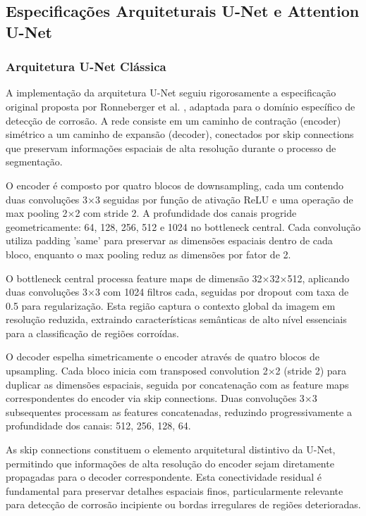 \documentclass[12pt,a4paper,twoside]{article}
\begin{document}
\subsection{Especificações Arquiteturais U-Net e Attention U-Net}
\label{subsec:arquiteturas}

\subsubsection{Arquitetura U-Net Clássica}
\label{subsubsec:unet_classica}

A implementação da arquitetura U-Net seguiu rigorosamente a especificação original proposta por Ronneberger et al. \cite{ronneberger2015u}, adaptada para o domínio específico de detecção de corrosão. A rede consiste em um caminho de contração (encoder) simétrico a um caminho de expansão (decoder), conectados por skip connections que preservam informações espaciais de alta resolução durante o processo de segmentação.

O encoder é composto por quatro blocos de downsampling, cada um contendo duas convoluções 3×3 seguidas por função de ativação ReLU e uma operação de max pooling 2×2 com stride 2. A profundidade dos canais progride geometricamente: 64, 128, 256, 512 e 1024 no bottleneck central. Cada convolução utiliza padding 'same' para preservar as dimensões espaciais dentro de cada bloco, enquanto o max pooling reduz as dimensões por fator de 2.

O bottleneck central processa feature maps de dimensão 32×32×512, aplicando duas convoluções 3×3 com 1024 filtros cada, seguidas por dropout com taxa de 0.5 para regularização. Esta região captura o contexto global da imagem em resolução reduzida, extraindo características semânticas de alto nível essenciais para a classificação de regiões corroídas.

O decoder espelha simetricamente o encoder através de quatro blocos de upsampling. Cada bloco inicia com transposed convolution 2×2 (stride 2) para duplicar as dimensões espaciais, seguida por concatenação com as feature maps correspondentes do encoder via skip connections. Duas convoluções 3×3 subsequentes processam as features concatenadas, reduzindo progressivamente a profundidade dos canais: 512, 256, 128, 64.

As skip connections constituem o elemento arquitetural distintivo da U-Net, permitindo que informações de alta resolução do encoder sejam diretamente propagadas para o decoder correspondente. Esta conectividade residual é fundamental para preservar detalhes espaciais finos, particularmente relevante para detecção de corrosão incipiente ou bordas irregulares de regiões deterioradas.
\end{document}
